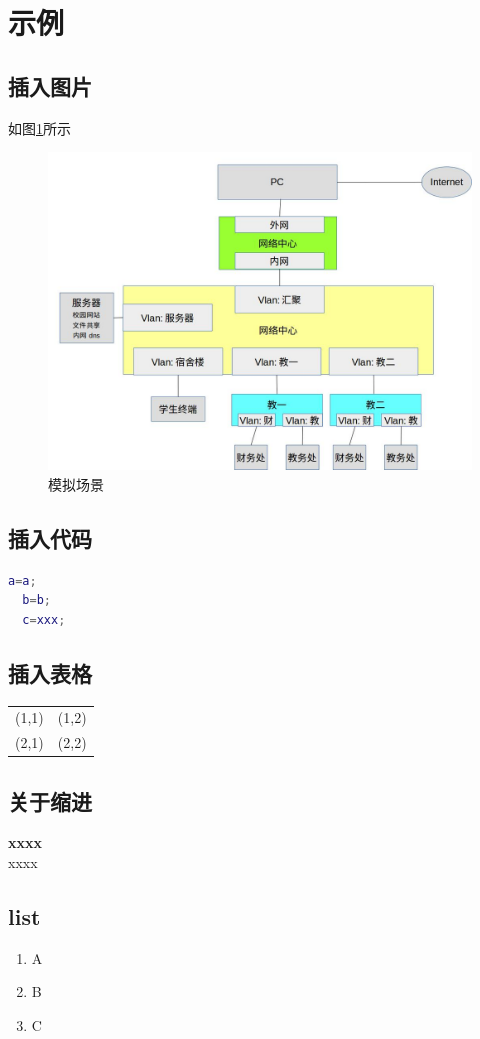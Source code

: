 
\section{示例}

\subsection{插入图片}
如图\ref{fig:top_realmeaning}所示\\
\begin{figure}[thbp!]
\centering\includegraphics[width=0.9\linewidth]{figure/top_realmeaning.jpg}
\caption{ 模拟场景}
\label{fig:top_realmeaning}
\end{figure}

\subsection{插入代码}
\begin{lstlisting}[language=matlab]
  a=a;
  b=b;
  c=xxx;
\end{lstlisting}

\subsection{插入表格}
\begin{tabular}{cc}%
(1,1)&(1,2)\\%
(2,1)&(2,2)\\%
\end{tabular}

\subsection{关于缩进}
\indent \textbf{xxxx}\\
\noindent xxxx

\subsection{list}
\begin{enumerate}
	\item A
	\item B
	\item C
\end{enumerate}

